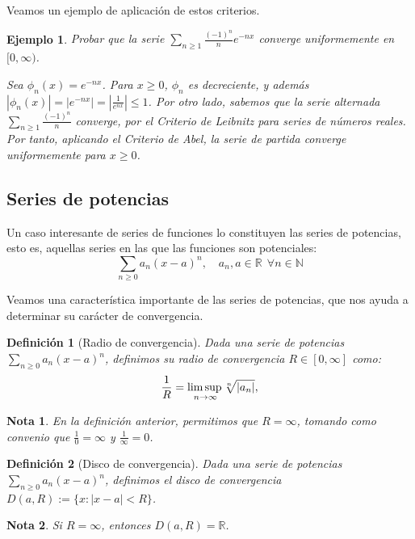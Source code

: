 \documentclass[11pt, a4paper]{article}
\theoremstyle{theorem-style}
\theoremstyle{definition-style}
\newtheorem*{ndef}{Definición}
\theoremstyle{remark-style}
\newtheorem*{nota}{Nota}
\theoremstyle{example-style}
\newtheorem{ejemplo}{Ejemplo}[section]
\begin{document}
Veamos un ejemplo de aplicación de estos criterios.

\begin{ejemplo}
	Probar que la serie $\displaystyle \sum_{n \ge 1} \frac{(-1)^n}{n} e^{-nx}$ converge uniformemente en $[0, \infty)$.
	
Sea $\phi_n(x) = e^{-nx}$. Para $x \ge 0$, $\phi_n$ es decreciente, y además $|\phi_n(x)| = | e^{-nx} |  = |\frac{1}{e^{nx}} |\le 1$. Por otro lado, sabemos que la serie alternada $ \sum_{n \ge 1} \frac{(-1)^n}{n}$ converge, por el \textit{Criterio de Leibnitz} para series de números reales. Por tanto, aplicando el \textit{Criterio de Abel}, la serie de partida converge uniformemente para $x \ge 0$.  
\end{ejemplo}

\subsection{Series de potencias}

Un caso interesante de series de funciones lo constituyen las series de potencias, esto es, aquellas series en las que las funciones son potenciales: $$\sum_{n \ge 0} a_n(x-a)^n, \quad a_n, a \in \mathbb{R} \ \ \forall n \in \mathbb{N}$$

Veamos una característica importante de las series de potencias, que nos ayuda a determinar su carácter de convergencia.

\begin{ndef}[Radio de convergencia] Dada una serie de potencias $\sum_{n \ge 0} a_n(x-a)^n$, definimos su radio de convergencia $R \in [0, \infty]$ como: $$
\frac{1}{R} =\underset{n\to\infty}{\mbox{lim\,sup\,}}  \sqrt[n]{|a_n|},$$
\end{ndef}

\begin{nota}
	En la definición anterior, permitimos que $R = \infty$, tomando como convenio que $\frac{1}{0} = \infty$ y $\frac{1}{\infty} = 0$.
\end{nota}

\begin{ndef}[Disco de convergencia] Dada una serie de potencias $\sum_{n \ge 0} a_n(x-a)^n$, definimos el disco de convergencia $D(a,R) := \{ x : |x-a| < R\}$. 
\end{ndef}

\begin{nota}
	Si $R = \infty$, entonces $D(a,R) = \mathbb{R}$.
\end{nota}
\end{document}
